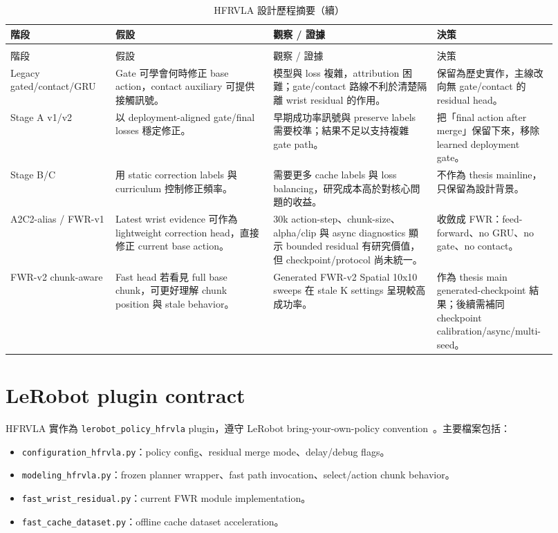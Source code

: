 \documentclass[12pt,a4paper,oneside]{report}
\newcommand{\method}{HFRVLA}
\begin{document}
\begin{longtable}{@{}p{0.18\linewidth}p{0.27\linewidth}p{0.28\linewidth}p{0.19\linewidth}@{}}
\caption{HFRVLA 設計歷程摘要。每一列記錄該階段的假設、觀察與後續決策。}\label{tab:design-history}\\
\toprule
階段 & 假設 & 觀察 / 證據 & 決策 \\
\midrule
\endfirsthead
\caption[]{HFRVLA 設計歷程摘要（續）}\\
\toprule
階段 & 假設 & 觀察 / 證據 & 決策 \\
\midrule
\endhead
\bottomrule
\endlastfoot
Legacy gated/contact/GRU &
Gate 可學會何時修正 base action，contact auxiliary 可提供接觸訊號。 &
模型與 loss 複雜，attribution 困難；gate/contact 路線不利於清楚隔離 wrist residual 的作用。 &
保留為歷史實作，主線改向無 gate/contact 的 residual head。 \\
Stage A v1/v2 &
以 deployment-aligned gate/final losses 穩定修正。 &
早期成功率訊號與 preserve labels 需要校準；結果不足以支持複雜 gate path。 &
把「final action after merge」保留下來，移除 learned deployment gate。 \\
Stage B/C &
用 static correction labels 與 curriculum 控制修正頻率。 &
需要更多 cache labels 與 loss balancing，研究成本高於對核心問題的收益。 &
不作為 thesis mainline，只保留為設計背景。 \\
A2C2-alias / FWR-v1 &
Latest wrist evidence 可作為 lightweight correction head，直接修正 current base action。 &
30k action-step、chunk-size、alpha/clip 與 async diagnostics 顯示 bounded residual 有研究價值，但 checkpoint/protocol 尚未統一。 &
收斂成 FWR：feed-forward、no GRU、no gate、no contact。 \\
FWR-v2 chunk-aware &
Fast head 若看見 full base chunk，可更好理解 chunk position 與 stale behavior。 &
Generated FWR-v2 Spatial 10x10 sweeps 在 stale K settings 呈現較高成功率。 &
作為 thesis main generated-checkpoint 結果；後續需補同 checkpoint calibration/async/multi-seed。 \\
\end{longtable}

\section{LeRobot plugin contract}

\method{} 實作為 \texttt{lerobot\_policy\_hfrvla} plugin，遵守 LeRobot bring-your-own-policy convention~\citep{cadene2026lerobot}。主要檔案包括：
\begin{itemize}
  \item \texttt{configuration\_hfrvla.py}：policy config、residual merge mode、delay/debug flags。
  \item \texttt{modeling\_hfrvla.py}：frozen planner wrapper、fast path invocation、select/action chunk behavior。
  \item \texttt{fast\_wrist\_residual.py}：current FWR module implementation。
  \item \texttt{fast\_cache\_dataset.py}：offline cache dataset acceleration。
\end{itemize}
\end{document}
